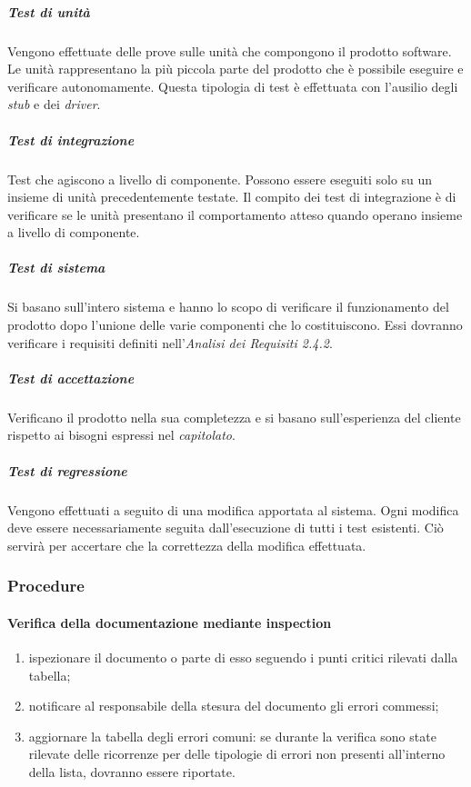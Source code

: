 \subparagraph*{Test di unità}
Vengono effettuate delle prove sulle unità che compongono il prodotto software. Le unità rappresentano la più piccola parte del prodotto che è possibile eseguire e verificare autonomamente. Questa tipologia di test è effettuata con l'ausilio degli \textit{stub\glo} e dei \textit{driver\glos}.

\subparagraph*{Test di integrazione}
Test che agiscono a livello di componente. Possono essere eseguiti solo su un insieme di unità precedentemente testate. Il compito dei test di integrazione è di verificare se le unità presentano il comportamento atteso quando operano insieme a livello di componente.

\subparagraph*{Test di sistema}
Si basano sull'intero sistema e hanno lo scopo di verificare il funzionamento del prodotto dopo l'unione delle varie componenti che lo costituiscono. Essi dovranno verificare i requisiti definiti nell'\textit{Analisi dei Requisiti 2.4.2\docs}.

\subparagraph*{Test di accettazione}
Verificano il prodotto nella sua completezza e si basano sull'esperienza del cliente rispetto ai bisogni espressi nel \textit{capitolato\glos}.

\subparagraph*{Test di regressione}
Vengono effettuati a seguito di una modifica apportata al sistema. Ogni modifica deve essere necessariamente seguita dall'esecuzione di tutti i test esistenti. Ciò servirà per accertare che la correttezza della modifica effettuata.


\subsubsection{Procedure}
\paragraph{Verifica della documentazione mediante inspection}
\begin{enumerate}
	\item ispezionare il documento o parte di esso seguendo i punti critici rilevati dalla tabella;
	\item notificare al responsabile della stesura del documento gli errori commessi;
	\item aggiornare la tabella degli errori comuni: se durante la verifica sono state rilevate delle ricorrenze per delle tipologie di errori non presenti all'interno della lista, dovranno essere riportate.
\end{enumerate}

